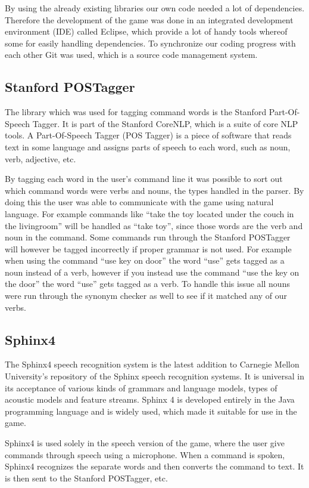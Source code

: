 By using the already existing libraries our own code needed a lot of dependencies. Therefore the development of the game was done in an integrated development environment (IDE) called Eclipse, which provide a lot of handy tools whereof some for easily handling dependencies. To synchronize our coding progress with each other Git was used, which is a source code management system.

\subsection{Stanford POSTagger}
The library which was used for tagging command words is the Stanford Part-Of-Speech Tagger. It is part of the Stanford CoreNLP, which is a suite of core NLP tools. A Part-Of-Speech Tagger (POS Tagger) is a piece of software that reads text in some language and assigns parts of speech to each word, such as noun, verb, adjective, etc. \citep{POSTagger}

By tagging each word in the user's command line it was possible to sort out which command words were verbs and nouns, the types handled in the parser. By doing this the user was able to communicate with the game using natural language. For example commands like ``take the toy located under the couch in the livingroom'' will be handled as ``take toy'', since those words are the verb and noun in the command. Some commands run through the Stanford POSTagger will however be tagged incorrectly if proper grammar is not used. For example when using the command ``use key on door'' the word ``use'' gets tagged as a noun instead of a verb, however if you instead use the command ``use the key on the door'' the word ``use'' gets tagged as a verb. To handle this issue all nouns were run through the synonym checker as well to see if it matched any of our verbs.

\subsection{Sphinx4}
The Sphinx4 speech recognition system is the latest addition to Carnegie Mellon University's repository of the Sphinx speech recognition systems. It is universal in its acceptance of various kinds of grammars and language models, types of acoustic models and feature streams. Sphinx 4 is developed entirely in the Java programming language and is widely used, which made it suitable for use in the game. \citep{Sphinx4}

Sphinx4 is used solely in the speech version of the game, where the user give commands through speech using a microphone. When a command is spoken, Sphinx4 recognizes the separate words and then converts the command to text. It is then sent to the Stanford POSTagger, etc.

